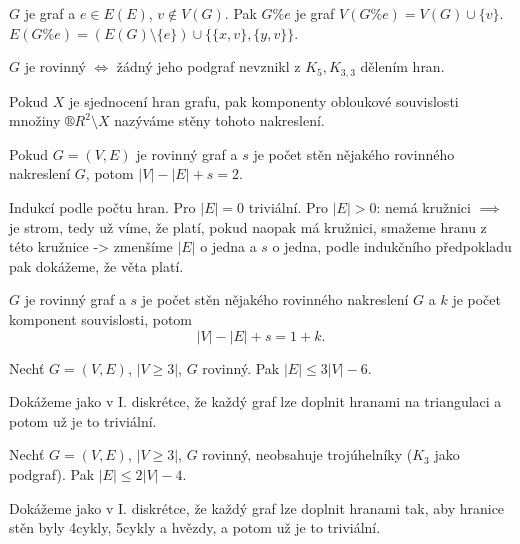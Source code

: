 \documentclass[12pt]{article}					%
\begin{document}
    \begin{definice}
        $G$ je graf a $e \in E(E)$, $v \notin V(G)$. Pak $G\%e$ je graf $V(G\%e) = V(G) \cup \{v\}$. $E(G\%e) = (E(G) \setminus \{e\}) \cup \{\{x, v\}, \{y, v\}\}$.
    \end{definice}

    \begin{veta}
        $G$ je rovinný $\Leftrightarrow$ žádný jeho podgraf nevznikl z $K_5, K_{3, 3}$ dělením hran.
    \end{veta}

    \begin{definice}[Stěny]
        Pokud $X$ je sjednocení hran grafu, pak komponenty obloukové souvislosti množiny $®R^2 \setminus X$ nazýváme stěny tohoto nakreslení.
    \end{definice}

    \begin{veta}
        Pokud $G = (V, E)$ je rovinný graf a $s$ je počet stěn nějakého rovinného nakreslení $G$, potom $|V| - |E| + s = 2$.


        \begin{dukazin}
            Indukcí podle počtu hran. Pro $|E| = 0$ triviální. Pro $|E|>0$: nemá kružnici $\implies$ je strom, tedy už víme, že platí, pokud naopak má kružnici, smažeme hranu z této kružnice -> zmenšíme $|E|$ o jedna a $s$ o jedna, podle indukčního předpokladu pak dokážeme, že věta platí.
        \end{dukazin}
    \end{veta}

    \begin{dusledek}
        $G$ je rovinný graf a $s$ je počet stěn nějakého rovinného nakreslení $G$ a $k$ je počet komponent souvislosti, potom
        $$ |V| - |E| + s = 1 + k. $$ 
    \end{dusledek}

    \begin{veta}
        Nechť $G=(V, E)$, $|V≥3|$, $G$ rovinný. Pak $|E| ≤ 3|V| - 6$.

        \begin{dukazin}
            Dokážeme jako v I. diskrétce, že každý graf lze doplnit hranami na triangulaci a potom už je to triviální.
        \end{dukazin}
    \end{veta}

    \begin{veta}
        Nechť $G=(V, E)$, $|V≥3|$, $G$ rovinný, neobsahuje trojúhelníky ($K_3$ jako podgraf). Pak $|E| ≤ 2|V| - 4$.

        \begin{dukazin}
            Dokážeme jako v I. diskrétce, že každý graf lze doplnit hranami tak, aby hranice stěn byly 4cykly, 5cykly a hvězdy, a potom už je to triviální.
        \end{dukazin}
    \end{veta}
\end{document}
